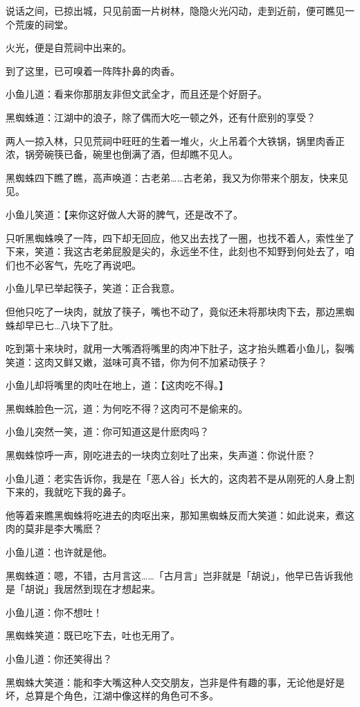 \documentclass[12pt,oneside]{book}
\begin{document}
说话之间，已掠出城，只见前面一片树林，隐隐火光闪动，走到近前，便可瞧见一个荒废的祠堂。

火光，便是自荒祠中出来的。

到了这里，已可嗅着一阵阵扑鼻的肉香。

小鱼儿道：看来你那朋友非但文武全才，而且还是个好厨子。

黑蜘蛛道：江湖中的浪子，除了偶而大吃一顿之外，还有什麽别的享受？

两人一掠入林，只见荒祠中旺旺的生着一堆火，火上吊着个大铁锅，锅里肉香正浓，锅旁碗筷已备，碗里也倒满了酒，但却瞧不见人。

黑蜘蛛四下瞧了瞧，高声唤道：古老弟\ldots\ldots 古老弟，我又为你带来个朋友，快来见见。

小鱼儿笑道：【来你这好做人大哥的脾气，还是改不了。

只听黑蜘蛛唤了一阵，四下却无回应，他又出去找了一圈，也找不着人，索性坐了下来，笑道：我这古老弟屁股是尖的，永远坐不住，此刻也不知野到何处去了，咱们也不必客气，先吃了再说吧。

小鱼儿早已举起筷子，笑道：正合我意。

但他只吃了一块肉，就放了筷子，嘴也不动了，竟似还未将那块肉下去，那边黑蜘蛛却早已七\ldots 八块下了肚。

吃到第十来块时，就用一大嘴酒将嘴里的肉冲下肚子，这才抬头瞧着小鱼儿，裂嘴笑道：这肉又鲜又嫩，滋味可真不错，你为何不加紧动筷子？

小鱼儿却将嘴里的肉吐在地上，道：【这肉吃不得。】

黑蜘蛛脸色一沉，道：为何吃不得？这肉可不是偷来的。

小鱼儿突然一笑，道：你可知道这是什麽肉吗？

黑蜘蛛惊呼一声，刚吃进去的一块肉立刻吐了出来，失声道：你说什麽？

小鱼儿道：老实告诉你，我是在「恶人谷」长大的，这肉若不是从刚死的人身上割下来的，我就吃下我的鼻子。

他等着来瞧黑蜘蛛将吃进去的肉呕出来，那知黑蜘蛛反而大笑道：如此说来，煮这肉的莫非是李大嘴麽？

小鱼儿道：也许就是他。

黑蜘蛛道：嗯，不错，古月言这\ldots\ldots「古月言」岂非就是「胡说」，他早已告诉我他是「胡说」我居然到现在才想起来。

小鱼儿道：你不想吐！

黑蜘蛛笑道：既已吃下去，吐也无用了。

小鱼儿道：你还笑得出？

黑蜘蛛大笑道：能和李大嘴这种人交交朋友，岂非是件有趣的事，无论他是好是坏，总算是个角色，江湖中像这样的角色可不多。
\end{document}
